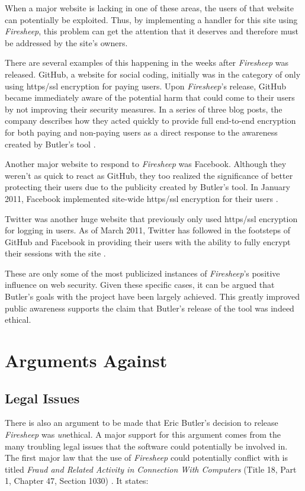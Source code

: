 \documentclass[11pt]{article}
\begin{document}
\begin{multicols}{2}
When a major website is lacking in one of these areas, the users of that website can potentially be exploited. Thus, by implementing a handler for this site using \emph{Firesheep}, this problem can get the attention that it deserves and therefore must be addressed by the site's owners.

There are several examples of this happening in the weeks after \emph{Firesheep} was released. GitHub, a website for social coding, initially was in the category of only using https/ssl encryption for paying users. Upon \emph{Firesheep}'s release, GitHub became immediately aware of the potential harm that could come to their users by not improving their security measures. In a series of three blog posts, the company describes how they acted quickly to provide full end-to-end encryption for both paying and non-paying users as a direct response to the awareness created by Butler's tool \cite{github_reaction}.

Another major website to respond to \emph{Firesheep} was Facebook. Although they weren't as quick to react as GitHub, they too realized the significance of better protecting their users due to the publicity created by Butler's tool. In January 2011, Facebook implemented site-wide https/ssl encryption for their users \cite{facebook_reaction}.

Twitter was another huge website that previously only used https/ssl encryption for logging in users. As of March 2011, Twitter has followed in the footsteps of GitHub and Facebook in providing their users with the ability to fully encrypt their sessions with the site \cite{twitter_reaction}.

These are only some of the most publicized instances of \emph{Firesheep}'s positive influence on web security. Given these specific cases, it can be argued that Butler's goals with the project have been largely achieved. This greatly improved public awareness supports the claim that Butler's release of the tool was indeed ethical.

\section{Arguments Against}
\subsection{Legal Issues}
There is also an argument to be made that Eric Butler's decision to release \emph{Firesheep} was \emph{un}ethical. A major support for this argument comes from the many troubling legal issues that the software could potentially be involved in. The first major law that the use of \emph{Firesheep} could potentially conflict with is titled \emph{Fraud and Related Activity in Connection With Computers} (Title 18, Part 1, Chapter 47, Section 1030) \cite{law_1}. It states:


\end{multicols}
\end{document}
